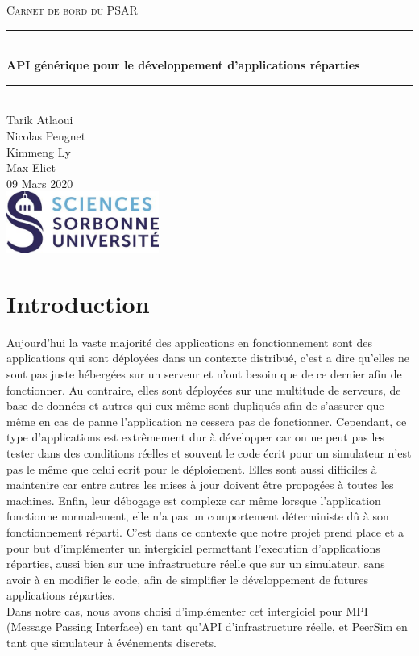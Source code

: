 \documentclass{article}
\date{\today}
\author{Tarik Atlaoui \\ Nicolas Peugnet \\ Kimmeng Ly \\ Max Eliet}
\begin{document}
\begin{titlepage}
	\enlargethispage{2cm}
	\newcommand{\HRule}{\rule{\linewidth}{0.5mm}}
	\center
	\textsc{\LARGE
	Carnet de bord du PSAR 
	} \\[1cm]
	\HRule \\[0.4cm]
	{ \huge \bfseries API générique pour le développement d'applications réparties \\[0.15cm] }
	\HRule \\[4cm]
	\large{Tarik Atlaoui \\[3mm] Nicolas Peugnet \\[3mm] Kimmeng Ly \\[3mm] Max Eliet} \\[3cm]
	09 Mars 2020 \\[3cm]
	\hfill \includegraphics[width=5cm]{logoSU.jpg}
\end{titlepage}

	\newpage
		\section{Introduction}
			\large{
			\indent Aujourd'hui la vaste majorité des applications en fonctionnement sont des applications qui sont déployées dans un contexte distribué, c'est a dire qu'elles
			ne sont pas juste hébergées sur un serveur et n'ont besoin que de ce dernier afin de fonctionner. Au contraire, elles sont déployées sur une multitude de serveurs, de base de données et autres 
			qui eux même sont dupliqués afin de s'assurer que même en cas de panne l'application ne cessera pas de fonctionner.
			Cependant, ce type d'applications est extrêmement dur à développer car on ne peut pas les tester dans des conditions réelles et souvent le code écrit pour un simulateur 
			n'est pas le même que celui ecrit pour le déploiement.
			Elles sont aussi difficiles à maintenire car entre autres les mises à jour doivent être propagées à toutes les machines. Enfin, leur débogage est complexe car même lorsque l'application
			fonctionne normalement, elle n'a pas un comportement déterministe dû à son fonctionnement réparti.
			\indent C'est dans ce contexte que notre projet prend place et a pour but d'implémenter un intergiciel permettant l'execution d'applications réparties, aussi bien sur une infrastructure réelle que sur un simulateur, sans avoir à en modifier le code, afin de simplifier le développement de futures applications réparties.
\\[2mm]
			 \indent Dans notre cas, nous avons choisi d'implémenter cet intergiciel pour MPI (Message Passing Interface) en tant qu'API d'infrastructure réelle, et PeerSim en tant que simulateur à événements discrets.}
		
\end{document}

